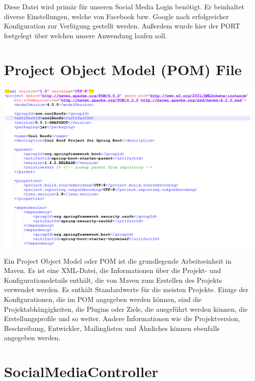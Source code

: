 \documentclass[12pt,a4paper]{article}
\begin{document}
Diese Datei wird primär für unseren Social Media Login benötigt. Er beinhaltet diverse Einstellungen, welche von Facebook bzw. Google nach erfolgreicher Konfiguration zur Verfügung gestellt werden. Außerdem wurde hier der PORT festgelegt über welchen unsere Anwendung laufen soll.
\clearpage


\section{Project Object Model (POM) File}

\hspace{-5em} \includegraphics[width=1.2\textwidth]{./Graphics/bild3}

Ein Project Object Model oder POM ist die grundlegende Arbeitseinheit in Maven. Es ist eine XML-Datei, die Informationen über die Projekt- und Konfigurationsdetails enthält, die von Maven zum Erstellen des Projekts verwendet werden. Es enthält Standardwerte für die meisten Projekte.
Einige der Konfigurationen, die im POM angegeben werden können, sind die Projektabhängigkeiten, die Plugins oder Ziele, die ausgeführt werden können, die Erstellungsprofile und so weiter. Andere Informationen wie die Projektversion, Beschreibung, Entwickler, Mailinglisten und Ähnliches können ebenfalls angegeben werden.






\vspace{-10em} \section{SocialMediaController}\vspace{-1em}
\end{document}

